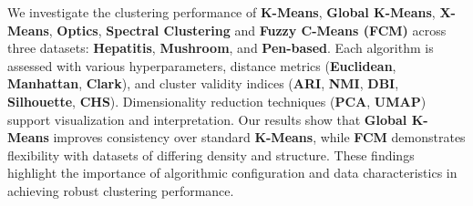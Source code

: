 We investigate the clustering performance of \textbf{K-Means}, \textbf{Global K-Means}, \textbf{X-Means}, \textbf{Optics}, \textbf{Spectral Clustering} and \textbf{Fuzzy C-Means (FCM)} across three datasets: \textbf{Hepatitis}, \textbf{Mushroom}, and \textbf{Pen-based}. Each algorithm is assessed with various hyperparameters, distance metrics (\textbf{Euclidean}, \textbf{Manhattan}, \textbf{Clark}), and cluster validity indices (\textbf{ARI}, \textbf{NMI}, \textbf{DBI}, \textbf{Silhouette}, \textbf{CHS}). Dimensionality reduction techniques (\textbf{PCA}, \textbf{UMAP}) support visualization and interpretation. Our results show that \textbf{Global K-Means} improves consistency over standard \textbf{K-Means}, while \textbf{FCM} demonstrates flexibility with datasets of differing density and structure. These findings highlight the importance of algorithmic configuration and data characteristics in achieving robust clustering performance.